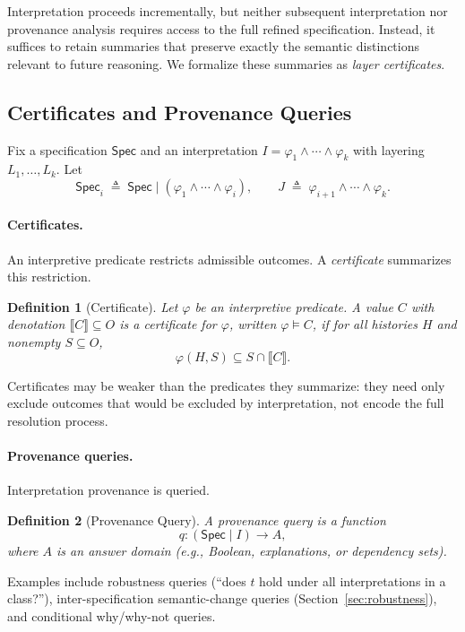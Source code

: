 \documentclass[acmsmall,nonacm]{acmart}
\newtheorem{definition}{Definition}
\theoremstyle{remark}
\numberwithin{definition}{section}
\numberwithin{theorem}{section}
\numberwithin{lemma}{section}
\numberwithin{corollary}{section}
\numberwithin{remark}{section}
\numberwithin{example}{section}
\numberwithin{observation}{section}
\numberwithin{assumption}{section}
\newcommand{\Spec}{\mathsf{Spec}}
\begin{document}
Interpretation proceeds incrementally, but neither subsequent interpretation nor
provenance analysis requires access to the full refined specification.
Instead, it suffices to retain summaries that preserve exactly the semantic
distinctions relevant to future reasoning.
We formalize these summaries as \emph{layer certificates}.

\subsection{Certificates and Provenance Queries}

Fix a specification $\Spec$ and an interpretation
$I = \varphi_1 \wedge \cdots \wedge \varphi_k$ with layering
$L_1,\ldots,L_k$.
Let
\[
  \Spec_i \;\triangleq\; \Spec \mid (\varphi_1 \wedge \cdots \wedge \varphi_i),
  \qquad
  J \;\triangleq\; \varphi_{i+1} \wedge \cdots \wedge \varphi_k .
\]

\paragraph{Certificates.}
An interpretive predicate restricts admissible outcomes.
A \emph{certificate} summarizes this restriction.

\begin{definition}[Certificate]
Let $\varphi$ be an interpretive predicate.
A value $C$ with denotation $\llbracket C \rrbracket \subseteq O$ is a
\emph{certificate} for $\varphi$, written $\varphi \models C$, if for all histories
$H$ and nonempty $S \subseteq O$,
\[
  \varphi(H,S) \subseteq S \cap \llbracket C \rrbracket .
\]
\end{definition}

Certificates may be weaker than the predicates they summarize: they need only
exclude outcomes that would be excluded by interpretation, not encode the full
resolution process.

\paragraph{Provenance queries.}
Interpretation provenance is queried.

\begin{definition}[Provenance Query]
A \emph{provenance query} is a function
\[
  q : (\Spec \mid I) \to A ,
\]
where $A$ is an answer domain (e.g., Boolean, explanations, or dependency sets).
\end{definition}

Examples include robustness queries (“does $t$ hold under all interpretations in a
class?”), inter-specification semantic-change queries (Section~\ref{sec:robustness}), and
conditional why/why-not queries.
\end{document}

